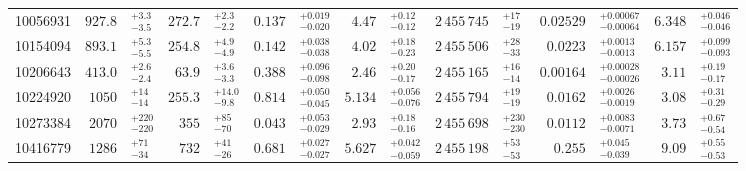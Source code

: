 \documentclass[a4paper,fleqn,usenatbib]{mnras}
\begin{document}
\begin{table*}
\begin{tabular}{r r@{}l r@{}l r@{}l r@{}l r@{}l r@{}l r@{}l}
10056931 & $927.8$&$^{+3.3}_{-3.5}$ & $272.7$&$^{+2.3}_{-2.2}$ & $0.137$&$^{+0.019}_{-0.020}$ & $4.47$&$^{+0.12}_{-0.12}$ & $2\,455\,745$&$^{+17}_{-19}$ & $0.02529$&$^{+0.00067}_{-0.00064}$ & $6.348$&$^{+0.046}_{-0.046}$\\
\vspace{1.5mm}
10154094 & $893.1$&$^{+5.3}_{-5.5}$ & $254.8$&$^{+4.9}_{-4.9}$ & $0.142$&$^{+0.038}_{-0.038}$ & $4.02$&$^{+0.18}_{-0.23}$ & $2\,455\,506$&$^{+28}_{-33}$ & $0.0223$&$^{+0.0013}_{-0.0013}$ & $6.157$&$^{+0.099}_{-0.093}$\\
\vspace{1.5mm}
10206643 & $413.0$&$^{+2.6}_{-2.4}$ & $63.9$&$^{+3.6}_{-3.3}$ & $0.388$&$^{+0.096}_{-0.098}$ & $2.46$&$^{+0.20}_{-0.17}$ & $2\,455\,165$&$^{+16}_{-14}$ & $0.00164$&$^{+0.00028}_{-0.00026}$ & $3.11$&$^{+0.19}_{-0.17}$\\
\vspace{1.5mm}
10224920 & $1050$&$^{+14}_{-14}$ & $255.3$&$^{+14.0}_{-9.8}$ & $0.814$&$^{+0.050}_{-0.045}$ & $5.134$&$^{+0.056}_{-0.076}$ & $2\,455\,794$&$^{+19}_{-19}$ & $0.0162$&$^{+0.0026}_{-0.0019}$ & $3.08$&$^{+0.31}_{-0.29}$\\
\vspace{1.5mm}
10273384 & $2070$&$^{+220}_{-220}$ & $355$&$^{+85}_{-70}$ & $0.043$&$^{+0.053}_{-0.029}$ & $2.93$&$^{+0.18}_{-0.16}$ & $2\,455\,698$&$^{+230}_{-230}$ & $0.0112$&$^{+0.0083}_{-0.0071}$ & $3.73$&$^{+0.67}_{-0.54}$\\
\vspace{1.5mm}
10416779 & $1286$&$^{+71}_{-34}$ & $732$&$^{+41}_{-26}$ & $0.681$&$^{+0.027}_{-0.027}$ & $5.627$&$^{+0.042}_{-0.059}$ & $2\,455\,198$&$^{+53}_{-53}$ & $0.255$&$^{+0.045}_{-0.039}$ & $9.09$&$^{+0.55}_{-0.53}$\\
\bottomrule
\end{tabular}
\end{table*}
\end{document}

